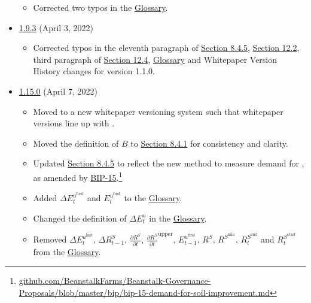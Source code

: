 \documentclass[class=article, crop=false]{standalone}
\begin{document}
\begin{itemize}[topsep=0pt, itemsep=3pt,leftmargin=16pt]
\begin{itemize}
        \item Corrected two typos in the \hyperlink{subsection.14.11}{Glossary}.
    \end{itemize}
         \item \href{https://github.com/BeanstalkFarms/Beanstalk/blob/master/version-history/beanstalk1_9_3.pdf}{1.9.3} (April 3, 2022)
    \begin{itemize}
        \item Corrected typos in the eleventh paragraph of \hyperlink{subsubsection.8.4.5}{Section 8.4.5}, \hyperlink{subsection.12.2}{Section 12.2}, third paragraph of \hyperlink{subsection.12.4}{Section 12.4}, \hyperlink{subsection.14.11}{Glossary} and Whitepaper Version History changes for version 1.1.0.
    \end{itemize}   
        \item \href{https://github.com/BeanstalkFarms/Beanstalk/blob/master/version-history/beanstalk1_15_0.pdf}{1.15.0} (April 7, 2022)
    \begin{itemize}
        \item Moved to a new whitepaper versioning system such that whitepaper versions line up with . 
        \item Moved the definition of $B$ to \hyperlink{subsubsection.8.4.1}{Section 8.4.1} for consistency and clarity. 
        \item Updated \hyperlink{subsubsection.8.4.5}{Section 8.4.5} to reflect the new method to measure demand for , as amended by \href{https://github.com/BeanstalkFarms/Beanstalk-Governance-Proposals/blob/master/bip/bip-15-demand-for-soil-improvement.md}{BIP-15}.\footnote{\href{https://github.com/BeanstalkFarms/Beanstalk-Governance-Proposals/blob/master/bip/bip-15-demand-for-soil-improvement.md}{github.com/BeanstalkFarms/Beanstalk-Governance-Proposals/blob/master/bip/bip-15-demand-for-soil-improvement.md}}
        \item Added  $\Delta E_{t}^{u^{\text{first}}}$ and $E_{t}^{u^{\text{first}}}$ to the \hyperlink{subsection.14.11}{Glossary}. 
        \item Changed the definition of $\Delta E_{t}^{u}$ in the \hyperlink{subsection.14.11}{Glossary}. 
        \item Removed $\Delta E_{t}^{u^{\text{last}}}$, $\Delta R_{t-1}^S$, $\frac{\partial R^S}{\partial t}$, $\frac{\partial R^S}{\partial t}^{\text{upper}}$, $E_{t-1}^{u^{\text{first}}}$, $R^S$, $R^{S^{\text{min}}}$, $R_t^{S^{\text{end}}}$ and $R_t^{S^{\text{start}}}$ from the \hyperlink{subsection.14.11}{Glossary}.

\end{itemize}
\end{itemize}
\end{document}
